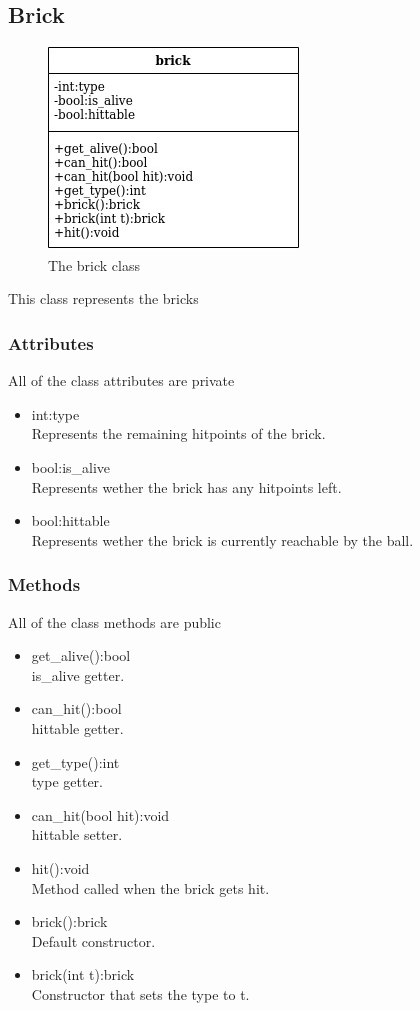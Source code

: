 \documentclass[]{article}
\begin{document}
\subsection{Brick}
\begin{figure}[h!]
    \centering
    \includegraphics[scale=0.5]{brick.jpg}
    \caption{The brick class}
    \label{fig:brick class diagram }
\end{figure}
This class represents the bricks
\subsubsection{Attributes}
All of the class attributes are private
\begin{itemize}
	\item int:type\\Represents the remaining hitpoints of the brick.
	\item bool:is\_alive\\Represents wether the brick has any hitpoints left.
	\item bool:hittable\\Represents wether the brick is currently reachable by the ball. 
\end{itemize}
\subsubsection{Methods}
All of the class methods are public
\begin{itemize}
	\item get\_alive():bool\\ is\_alive getter.
	\item can\_hit():bool\\hittable getter.
	\item get\_type():int\\ type getter.
	\item can\_hit(bool hit):void\\hittable setter.
	\item hit():void\\ Method called when the brick gets hit.
	\item brick():brick\\Default constructor.
	\item brick(int t):brick\\Constructor that sets the type to t.
\end{itemize}
\end{document}

